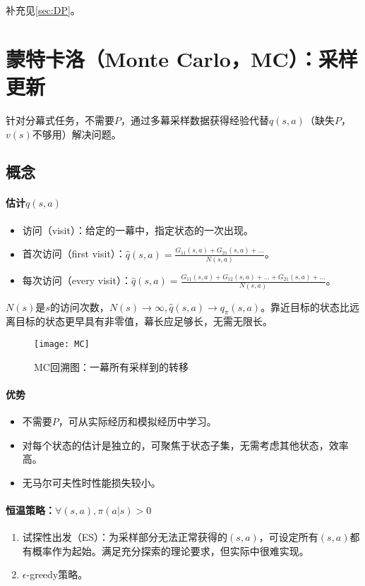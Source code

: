 \documentclass[
12pt, %
a4paper, 
oneside, %
headinclude,footinclude, %
]{scrartcl}
\begin{document}
补充见\ref{sec:DP}。
\section[蒙特卡洛]{蒙特卡洛（Monte Carlo，MC）：采样更新}
针对分幕式任务，不需要$ P $，通过多幕采样数据获得经验代替$ q(s, a) $（缺失$ P $，$ v(s) $不够用）解决问题。
\subsection[概念]{概念}
\paragraph{估计$ q(s, a) $}
\begin{itemize}
\item 访问（visit）：给定的一幕中，指定状态的一次出现。
\item 首次访问（first visit）：$ \hat{q}(s, a) = \frac{G_{11}(s, a) + G_{21}(s, a) + \dots}{N(s, a)} $。
\item 每次访问（every visit）：$ \hat{q}(s, a) = \frac{G_{11}(s, a) + G_{12}(s, a) + \dots + G_{21}(s, a) + \dots}{N(s, a)} $。
\end{itemize}

$ N(s) $是$ s $的访问次数，$ N(s) \to \infty, \hat{q}(s, a) \to q_{\pi}(s, a) $。靠近目标的状态比远离目标的状态更早具有非零值，幕长应足够长，无需无限长。

\begin{figure}[H]
\centering 
\texttt{[image: MC]} 
\caption[MC回溯图]{MC回溯图：一幕所有采样到的转移}
\end{figure}
\paragraph{优势}
\begin{itemize}
\item 不需要$ P $，可从实际经历和模拟经历中学习。
\item 对每个状态的估计是独立的，可聚焦于状态子集，无需考虑其他状态，效率高。
\item 无马尔可夫性时性能损失较小。
\end{itemize}
\paragraph{恒温策略：$ \forall(s, a), \pi(a|s) > 0 $}
\begin{enumerate}
\item 试探性出发（ES）：为采样部分无法正常获得的$ (s, a) $，可设定所有$ (s, a) $都有概率作为起始。满足充分探索的理论要求，但实际中很难实现。
\item $ \epsilon $-greedy策略。
\end{enumerate}
\end{document}
